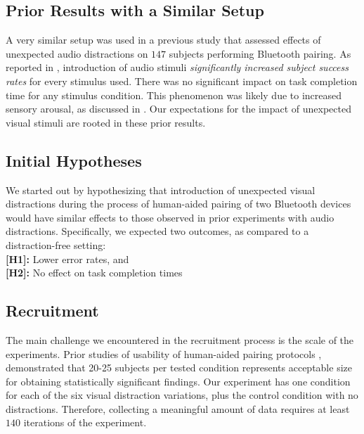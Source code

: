 \documentclass{llncs}
\begin{document}
\subsection{Prior Results with a Similar Setup}
%
A very similar setup was used in a previous study that assessed effects 
of unexpected audio distractions on $147$ subjects performing Bluetooth pairing.
As reported in \cite{kaczmarek_unattended_2015}, introduction of audio stimuli 
\emph{significantly increased subject success rates} for every stimulus used. 
There was no significant impact on task completion time for any 
stimulus condition. This phenomenon was likely due
to increased sensory arousal, as discussed in \cite{kaczmarek_unattended_2015}.
Our expectations for the impact of unexpected visual stimuli are rooted in these prior results.

\subsection{Initial Hypotheses} \label{hypo}
%
We started out by hypothesizing that introduction of unexpected visual distractions during the process
of human-aided pairing of two Bluetooth devices would have similar effects to those observed in prior
experiments with audio distractions. Specifically, we expected two outcomes, as compared to a 
distraction-free setting: \\
%
%
\hspace{1.0cm} {\bf [H1]:} Lower error rates, and \\  
\hspace{1.0cm} {\bf [H2]:} No effect on task completion times
%

\subsection{Recruitment}
%
The main challenge we encountered in the recruitment process is the scale of the experiments.
Prior studies of usability of human-aided pairing protocols 
\cite{goodrich_using_2009,nithyanand_groupthink:_2010,kainda_usability_2009}, 
demonstrated that 20-25 subjects per tested condition represents acceptable size for obtaining 
statistically significant findings. Our experiment has one condition for each of the six visual 
distraction variations, plus the control condition with no distractions. Therefore, collecting a 
meaningful amount of data requires at least $140$ iterations of the experiment. 
\end{document}
